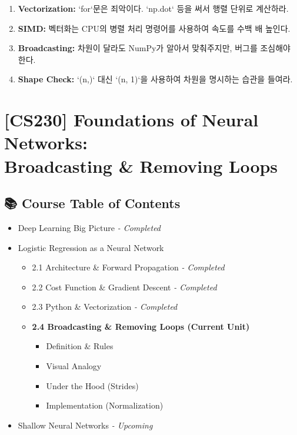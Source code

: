 \documentclass[11pt,a4paper]{book}
\theoremstyle{definition}
\begin{document}
\begin{summarybox}[title={단원 요약 (Cheat Sheet)}]
\begin{enumerate}
    \item \textbf{Vectorization:} `for`문은 죄악이다. `np.dot` 등을 써서 행렬 단위로 계산하라.
    \item \textbf{SIMD:} 벡터화는 CPU의 병렬 처리 명령어를 사용하여 속도를 수백 배 높인다.
    \item \textbf{Broadcasting:} 차원이 달라도 NumPy가 알아서 맞춰주지만, 버그를 조심해야 한다.
    \item \textbf{Shape Check:} `(n,)` 대신 `(n, 1)`을 사용하여 차원을 명시하는 습관을 들여라.
\end{enumerate}
\end{summarybox}


\chapter{[CS230] Foundations of Neural Networks: \\ Broadcasting \& Removing Loops}
\label{ch:lecture5}

\section*{📚 Course Table of Contents}
\begin{itemize}
    \item[Chapter 1.] Deep Learning Big Picture \textit{- Completed}
    \item[Chapter 2.] Logistic Regression as a Neural Network
    \begin{itemize}
        \item 2.1 Architecture \& Forward Propagation \textit{- Completed}
        \item 2.2 Cost Function \& Gradient Descent \textit{- Completed}
        \item 2.3 Python \& Vectorization \textit{- Completed}
        \item \textbf{2.4 Broadcasting \& Removing Loops (Current Unit)}
        \begin{itemize}
            \item Definition \& Rules
            \item Visual Analogy
            \item Under the Hood (Strides)
            \item Implementation (Normalization)
        \end{itemize}
    \end{itemize}
    \item[Chapter 3.] Shallow Neural Networks \textit{- Upcoming}
\end{itemize}
\end{document}

